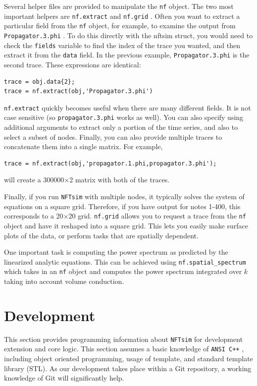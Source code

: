 \documentclass[12pt,a4paper]{article}
\newcommand{\type}[1]{{\small\small\tt #1} }
\newcommand{\NF}[0]{\type{NFTsim}}
\begin{document}

Several helper files are provided to manipulate the \type{nf} object. The two most important helpers are \type{nf.extract} and \type{nf.grid}. Often you want to extract a particular field from the \type{nf} object, for example, to examine the output from \type{Propagator.3.phi}. To do this directly with the nftsim struct, you would need to check the \type{fields} variable to find the index of the trace you wanted, and then extract it from the \type{data} field. In the previous example, \type{Propagator.3.phi} is the second trace. These expressions are identical:
\begin{lstlisting}
trace = obj.data{2};
trace = nf.extract(obj,'Propagator.3.phi')
\end{lstlisting}
\type{nf.extract} quickly becomes useful when there are many different fields. It is not case sensitive (so \type{propagator.3.phi} works as well). You can also specify using additional arguments to extract only a portion of the time series, and also to select a subset of nodes. Finally, you can also provide multiple traces to concatenate them into a single matrix. For example,
\begin{lstlisting}
trace = nf.extract(obj,'propagator.1.phi,propagator.3.phi');
\end{lstlisting}
will create a 300000$\times$2 matrix with both of the traces.

Finally, if you run \NF with multiple nodes, it typically solves the system of equations on a square grid. Therefore, if you have output for notes 1-400, this corresponds to a 20$\times$20 grid. \type{nf.grid} allows you to request a trace from the \type{nf} object and have it reshaped into a square grid. This lets you easily make surface plots of the data, or perform tasks that are spatially dependent.

One important task is computing the power spectrum as predicted by the linearized analytic equations. This can be achieved using \type{nf.spatial\_spectrum} which takes in an \type{nf} object and computes the power spectrum integrated over $k$ taking into account volume conduction.

\section{Development}
\label{sec:dev}

This section provides programming information about \NF for development extension and core logic. This section assumes a basic knowledge of \type{ANSI C++}, including object oriented programming, usage of template, and standard template library (STL). As our development takes place within a Git repository, a working knowledge of Git will significantly help.
\end{document}
